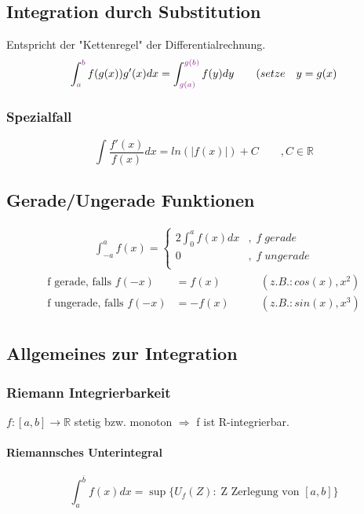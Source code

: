 \documentclass[12pt,a4paper]{report}%
\numberwithin{equation}{section}
\newcommand{\R}{\mathbb{R}} %
\newcommand{\subsubsubsection}{\paragraph}
\def\colBord#1{\begingroup\color{Fuchsia}{#1}\endgroup}
\numberwithin{equation}{subsection}
\begin{document}
\subsection{Integration durch Substitution}
Entspricht der "Kettenregel" der Differentialrechnung.
\begin{equation}
\int_{\colBord{a}}^{\colBord{b}} f(g(x))g'(x) dx = \int_{\colBord{g(a)}}^{\colBord{g(b)}} f(y) dy \qquad (setze \quad y = g(x) \label{eq:rule_subs}
\end{equation}

\subsubsection{Spezialfall}
\begin{equation}
\int \frac{f'(x)}{f(x)} dx = ln(|f(x)|) + C \qquad ,C\in\R \label{eq:rule_spec}
\end{equation}

\subsection{Gerade/Ungerade Funktionen}
\begin{align}
\int_{-a}^a f(x) = 
\begin{cases}
2 \int_0^a f(x) dx &,\; f\; gerade\\
0 &,\; f\; ungerade\\
\end{cases} \label{eq:evenodd}
\end{align}
\begin{align*}
\text{f gerade, falls }f(-x) &= f(x) \qquad &(z.B.: cos(x), x^2)\\
\text{f ungerade, falls }f(-x) &= -f(x) \qquad &(z.B.: sin(x), x^3)\\
\end{align*}

\subsection{Allgemeines zur Integration}
\subsubsection{Riemann Integrierbarkeit}
$f:[a,b] \rightarrow \R$ stetig bzw. monoton \newline
$\Rightarrow$ f ist R-integrierbar.

\subsubsubsection{Riemannsches Unterintegral}
\begin{equation}
\int_{a}^{\bar{b}} f(x) dx = \sup\{U_f(Z): \; \text{Z Zerlegung von }[a,b]\}
\end{equation}
\end{document}
